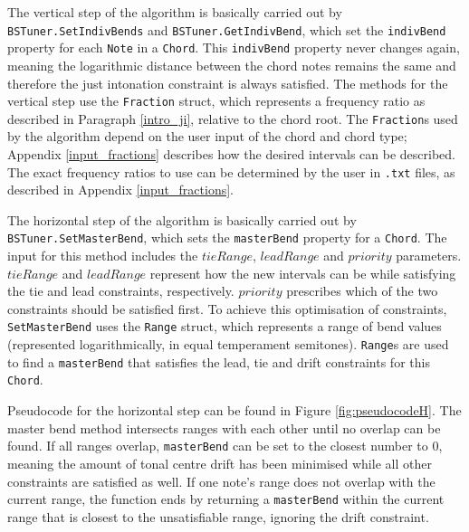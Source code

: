 \documentclass[a4paper]{article}
\begin{document}
\begin{sloppypar}
The vertical step of the algorithm is basically carried out by \texttt{BSTuner.SetIndivBends} and \texttt{BSTuner.GetIndivBend}, which set the \texttt{indivBend} property for each \texttt{Note} in a \texttt{Chord}. This \texttt{indivBend} property never changes again, meaning the logarithmic distance between the chord notes remains the same and therefore the just intonation constraint is always satisfied. The methods for the vertical step use the \texttt{Fraction} struct, which represents a frequency ratio as described in Paragraph \ref{intro_ji}, relative to the chord root. The \texttt{Fraction}s used by the algorithm depend on the user input of the chord and chord type; Appendix \ref{input_fractions} describes how the desired intervals can be described. The exact frequency ratios to use can be determined by the user in \texttt{.txt} files, as described in Appendix \ref{input_fractions}.

The horizontal step of the algorithm is basically carried out by \texttt{BSTuner.SetMasterBend}, which sets the \texttt{masterBend} property for a \texttt{Chord}. The input for this method includes the $\mathit{tieRange}$, $\mathit{leadRange}$ and $\mathit{priority}$ parameters. $\mathit{tieRange}$ and $\mathit{leadRange}$ represent how  the new intervals can be while satisfying the tie and lead constraints, respectively. $\mathit{priority}$ prescribes which of the two constraints should be satisfied first. To achieve this optimisation of constraints, \texttt{SetMasterBend} uses the \texttt{Range} struct, which represents a range of bend values (represented logarithmically, in equal temperament semitones). \texttt{Range}s are used to find a \texttt{masterBend} that satisfies the lead, tie and drift constraints for this \texttt{Chord}.
\end{sloppypar}

Pseudocode for the horizontal step can be found in Figure \ref{fig:pseudocodeH}. The master bend method intersects ranges with each other until no overlap can be found. If all ranges overlap, \texttt{masterBend} can be set to the closest number to 0, meaning the amount of tonal centre drift has been minimised while all other constraints are satisfied as well. If one note's range does not overlap with the current range, the function ends by returning a \texttt{masterBend} within the current range that is closest to the unsatisfiable range, ignoring the drift constraint.
\end{document}
